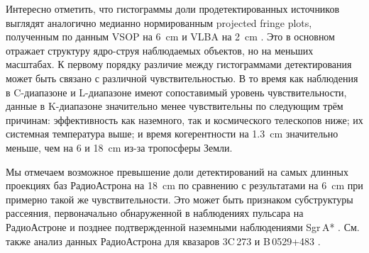 Интересно отметить, что гистограммы доли продетектированных источников выглядят аналогично
медианно нормированным projected fringe plots, полученным по данным VSOP на \SI{6}{\cm}
\cite{Horiuchi_2004} и VLBA на \SI{2}{\cm} \cite{Kovalev_2005}. Это в основном отражает
структуру ядро-струя наблюдаемых объектов, но на меньших масштабах. К первому порядку
различие между гистограммами детектирования может быть связано с различной чувствительностью. В то
время как наблюдения в C-диапазоне и L-диапазоне имеют сопоставимый уровень чувствительности, данные
в K-диапазоне значительно менее чувствительны по следующим трём причинам: эффективность как
наземного, так и космического телескопов ниже; их системная температура выше; и время когерентности
на \SI{1.3}{\cm} значительно меньше, чем на 6 и \SI{18}{\cm} из-за тропосферы Земли.

Мы отмечаем возможное превышение доли детектирований на самых длинных проекциях баз
РадиоАстрона на \SI{18}{\cm} по сравнению с результатами на \SI{6}{\cm} при примерно такой же
чувствительности. Это может быть признаком субструктуры рассеяния, первоначально обнаруженной в
наблюдениях пульсара на РадиоАстроне \cite{Gwinn_2016,Popov_2017} и позднее
подтвержденной наземными наблюдениями Sgr\,A* \cite{Gwinn_2014,Johnson_2018}. См. также анализ
данных РадиоАстрона для квазаров 3C\,273 \cite{Johnson_2016} и B\,0529+483 \cite{Pilipenko_2018}.
